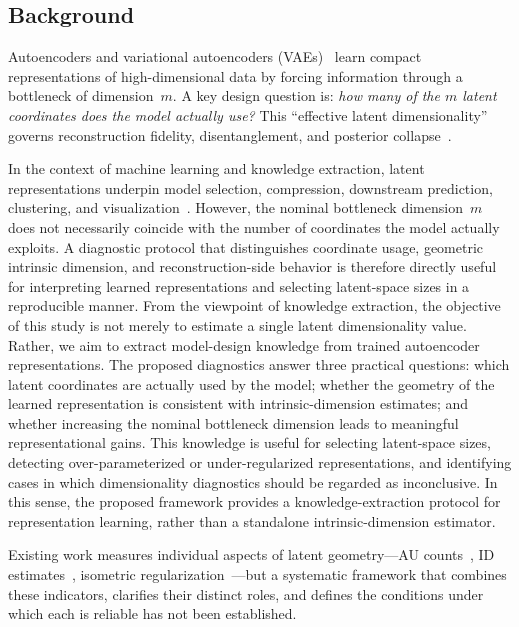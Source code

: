 \documentclass[make,article,submit,pdftex,moreauthors]{Definitions/mdpi}
\begin{document}
\subsection{Background}\label{sec:intro_bg}

Autoencoders and variational autoencoders (VAEs)~\cite{kingma2014vae} learn
compact representations of high-dimensional data by forcing information through
a bottleneck of dimension~$m$.  A key design question is: \emph{how many of
the $m$ latent coordinates does the model actually use?}  This ``effective
latent dimensionality'' governs reconstruction fidelity, disentanglement, and
posterior collapse~\cite{lucas2019elbo}.

In the context of machine learning and knowledge extraction, latent
representations underpin model selection, compression, downstream prediction,
clustering, and visualization~\cite{bengio2013representation}.
However, the nominal bottleneck dimension~$m$ does not necessarily coincide
with the number of coordinates the model actually exploits.
A diagnostic protocol that distinguishes coordinate usage, geometric intrinsic
dimension, and reconstruction-side behavior is therefore directly useful for
interpreting learned representations and selecting latent-space sizes in a
reproducible manner.
From the viewpoint of knowledge extraction, the objective of this study is not
merely to estimate a single latent dimensionality value.
Rather, we aim to extract model-design knowledge from trained autoencoder
representations.
The proposed diagnostics answer three practical questions: which latent
coordinates are actually used by the model; whether the geometry of the learned
representation is consistent with intrinsic-dimension estimates; and whether
increasing the nominal bottleneck dimension leads to meaningful representational
gains.
This knowledge is useful for selecting latent-space sizes, detecting
over-parameterized or under-regularized representations, and identifying cases
in which dimensionality diagnostics should be regarded as inconclusive.
In this sense, the proposed framework provides a knowledge-extraction protocol
for representation learning, rather than a standalone intrinsic-dimension
estimator.

Existing work measures individual aspects of latent geometry—AU
counts~\cite{lucas2019elbo,higgins2017betavae}, ID
estimates~\cite{facco2017twonn,levina2005mle}, isometric
regularization~\cite{kato2020rdae}—but a systematic framework that combines
these indicators, clarifies their distinct roles, and defines the conditions
under which each is reliable has not been established.
\end{document}

